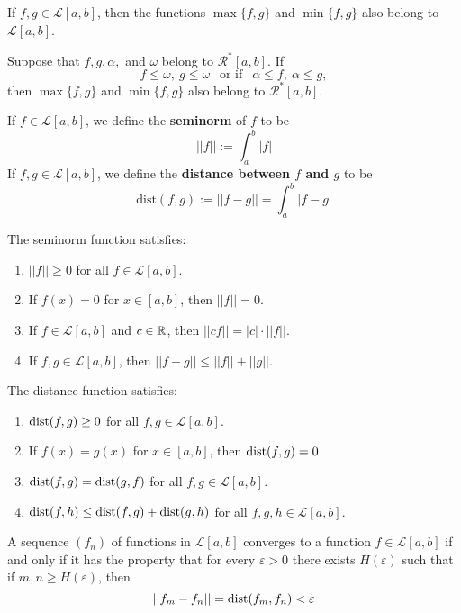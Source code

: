 \begin{theorem}
	If $f,g \in \mathcal{L}[a,b]$, then the functions $\max \{f,g\}$ and $\min \{f,g\}$ also belong to $\mathcal{L}[a,b]$.
\end{theorem}

\begin{theorem}
	Suppose that $f,g,\alpha,$ and $\omega$ belong to $\mathcal{R}^*[a,b]$. If
	\[f\leq\omega,\ g\leq\omega\ \ \text{  or if  }\ \ \alpha\leq f,\ \alpha \leq g,\]
	then $\max \{f,g\}$ and $\min\{f,g\}$ also belong to $\mathcal{R}^*[a,b]$.
\end{theorem}

\begin{definition}
	If $f \in \mathcal{L}[a,b]$, we define the \textbf{seminorm} of $f$ to be
	\[||f||:=\displaystyle\int_{a}^{b}|f|\]
	If $f,g \in \mathcal{L}[a,b]$, we define the \textbf{distance between $f$ and $g$} to be
	\[\text{dist}(f,g):=||f-g||=\displaystyle\int_{a}^{b}|f-g|\]
\end{definition}

\begin{theorem}
	The seminorm function satisfies:
	\begin{enumerate}
		\item $||f||\geq 0$ for all $f \in \mathcal{L}[a,b]$.
		\item If $f(x)=0$ for $x \in [a,b]$, then $||f||=0$.
		\item If $f \in \mathcal{L}[a,b]$ and $c \in \mathbb{R}$, then $||cf||=|c|\cdot||f||$.
		\item If $f,g \in \mathcal{L}[a,b]$, then $||f+g||\leq||f||+||g||$.
	\end{enumerate}
\end{theorem}

\begin{theorem}
	The distance function satisfies:
	\begin{enumerate}
		\item $\text{dist}(f,g)\geq 0$ for all $f,g \in \mathcal{L}[a,b]$.
		\item If $f(x)=g(x)$ for $x \in [a,b]$, then $\text{dist}(f,g)=0$.
		\item $\text{dist}(f,g)=\text{dist}(g,f)$ for all $f,g \in \mathcal{L}[a,b]$.
		\item $\text{dist}(f,h)\leq\text{dist}(f,g)+\text{dist}(g,h)$ for all $f,g,h \in \mathcal{L}[a,b]$.
	\end{enumerate}
\end{theorem}

\begin{theorem}
	A sequence $(f_n)$ of functions in $\mathcal{L}[a,b]$ converges to a function $f \in \mathcal{L}[a,b]$ if and only if it has the property that for every $\varepsilon>0$ there exists $H(\varepsilon)$ such that if $m,n\geq H(\varepsilon)$, then
	\[||f_m-f_n||=\text{dist}(f_m,f_n)<\varepsilon\]
\end{theorem}

